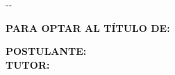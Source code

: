 {\begin{cambiamargen}{-\cambioIzquierdo}{-\cambioDerecho}
      \vfill

    \begin{large}
      \begin{center}
        \textbf{\tituloPortadaVal}
        \end{center}
    \end{large}

      \vfill

    \begin{large}
      \begin{center}
        \textbf{PARA OPTAR AL TÍTULO DE: \tituloAOptarVal}\\[4mm]
      \end{center}
    \end{large}

    \begin{normalsize}
      \begin{center}
        \textbf{POSTULANTE: \autorPortadaVal}\\[0.3cm]
        \textbf{TUTOR: \nombreAsesorVal}\\[0.3cm]
      \end{center}
    \end{normalsize}
  
    \begin{normalsize}
      \begin{center}
        \textbf{\lugarPublicacionVal}\\
        \textbf{\fechaPublicacionVal}
      \end{center}
    \end{normalsize}
    
  \end{cambiamargen}

  \newpage

  
  
}
